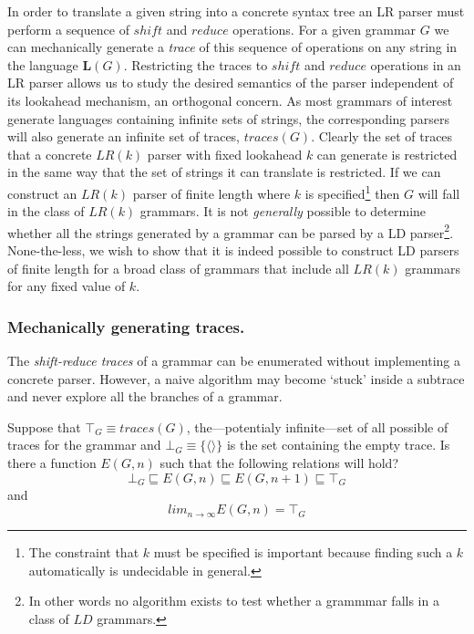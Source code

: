 \documentclass[A4]{sig-alternate}
\begin{document}
In order to translate a given string into a concrete syntax tree an LR parser must perform a sequence of $shi\!ft$ and $reduce$ operations.
For a given grammar $G$ we can mechanically generate a \emph{trace} of this sequence of operations on any string in the language $\boldsymbol{L}(G)$.
Restricting the traces to $shi\!ft$ and $reduce$ operations in an LR parser allows us to study the desired semantics of the parser independent of its lookahead mechanism, an orthogonal concern.
As most grammars of interest generate languages containing infinite sets of strings, the corresponding parsers will also generate an infinite set of traces, $traces(G)$.
Clearly the set of traces that a concrete $LR(k)$ parser with fixed lookahead $k$ can generate is restricted in the same way that the set of strings it can translate is restricted.
If we can construct an $LR(k)$ parser of finite length where $k$ is specified\footnote{The constraint that $k$ must be specified is important because finding such a $k$ automatically is undecidable in general.}
then $G$ will fall in the class of $LR(k)$ grammars.
It is not \emph{generally} possible to determine whether all the strings generated by a grammar can be parsed by a LD parser\footnote{In other words no algorithm exists to test whether a grammmar falls in a class of $LD$ grammars.}.
None-the-less, we wish to show that it is indeed possible to construct LD parsers of finite length for a broad class of grammars that include all $LR(k)$ grammars for any fixed value of $k$.


\subsubsection{Mechanically generating traces.}

The \emph{shift-reduce traces} of a grammar can be enumerated without implementing a concrete parser.
However, a naive algorithm may become `stuck' inside a subtrace and never explore all the branches of a grammar.

Suppose that $\top_{G} \equiv traces(G)$, the---potentialy infinite---set of all possible of traces for the grammar and $\bot_{G} \equiv \{ \langle \rangle \}$ is the set containing the empty trace.
Is there a function $E(G,n)$ such that the following relations will hold?
\begin{equation*} \bot_{G} \sqsubseteq E(G, n) \sqsubseteq E(G, n+1) \sqsubseteq \top_{G} \end{equation*}
and
\begin{equation*} lim_{n \to \infty} E(G,n) = \top_{G} \end{equation*}
\end{document}
